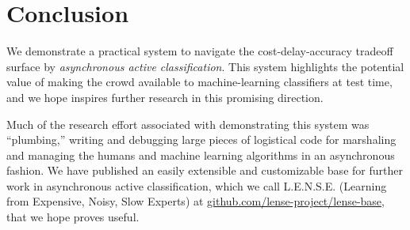 \section{Conclusion}
\label{sec:conclusion}

We demonstrate a practical system to navigate the cost-delay-accuracy tradeoff surface by \textit{asynchronous active classification}.
 This system highlights the potential value of making the crowd available to machine-learning classifiers at test time, and we hope inspires further research in this promising direction.

Much of the research effort associated with demonstrating this system was ``plumbing,'' writing and debugging large pieces of logistical code for marshaling and managing the humans and machine learning algorithms in an asynchronous fashion.
 We have published an easily extensible and customizable base for further work in asynchronous active classification, which we call L.E.N.S.E. (Learning from Expensive, Noisy, Slow Experts) at \url{github.com/lense-project/lense-base}, that we hope proves useful.

